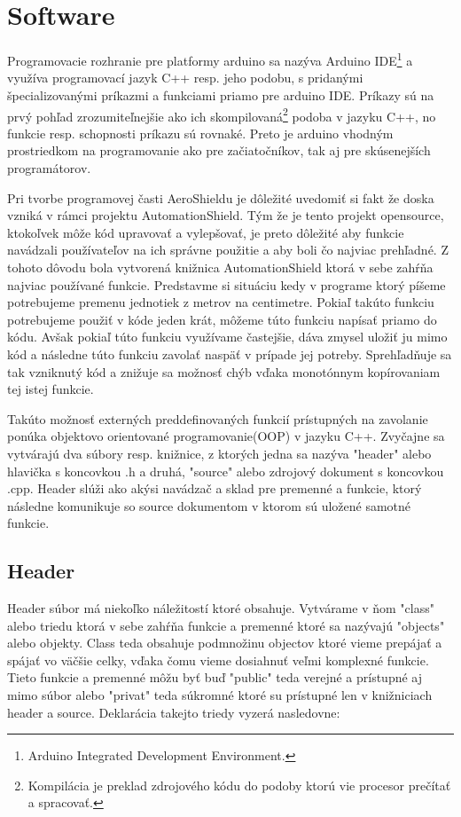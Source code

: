 \section{Software}

Programovacie rozhranie pre platformy arduino sa nazýva Arduino IDE\footnote[5]{Arduino Integrated Development Environment.} a využíva programovací jazyk C++ resp. jeho podobu, s pridanými špecializovanými príkazmi a funkciami priamo pre arduino IDE. Príkazy sú na prvý pohľad zrozumiteľnejšie ako ich skompilovaná\footnote[6]{Kompilácia je preklad zdrojového kódu do podoby ktorú vie procesor prečítať a spracovať.} podoba v jazyku C++, no funkcie resp. schopnosti príkazu sú rovnaké. Preto je arduino vhodným prostriedkom na programovanie ako pre začiatočníkov, tak aj pre skúsenejších programátorov. 

Pri tvorbe programovej časti AeroShieldu je dôležité uvedomiť si fakt že doska vzniká v rámci projektu AutomationShield. Tým že je tento projekt opensource, ktokoľvek môže kód upravovať a vylepšovať, je preto dôležité aby funkcie navádzali používateľov na ich správne použitie a aby boli čo najviac prehľadné. Z tohoto dôvodu bola vytvorená knižnica AutomationShield ktorá v sebe zahŕňa najviac používané funkcie. Predstavme si situáciu kedy v programe ktorý píšeme potrebujeme premenu jednotiek z metrov na centimetre. Pokiaľ takúto funkciu potrebujeme použiť v kóde jeden krát, môžeme túto funkciu napísať priamo do kódu. Avšak pokiaľ túto funkciu využívame častejšie, dáva zmysel uložiť ju mimo kód a následne túto funkciu zavolať naspäť v prípade jej potreby. Sprehľadňuje sa tak vzniknutý kód a znižuje sa možnosť chýb vďaka monotónnym kopírovaniam tej istej funkcie. 

Takúto možnosť externých preddefinovaných funkcií prístupných na zavolanie ponúka objektovo orientované programovanie(OOP) v jazyku C++. Zvyčajne sa vytvárajú dva súbory resp. knižnice, z ktorých jedna sa nazýva "header" alebo hlavička s koncovkou .h a druhá, "source" alebo zdrojový dokument s koncovkou .cpp. Header slúži ako akýsi navádzač a sklad pre premenné a funkcie, ktorý následne komunikuje so source dokumentom v ktorom sú uložené samotné funkcie. 

\subsection{Header}

Header súbor má niekoľko náležitostí ktoré obsahuje. Vytvárame v ňom "class" alebo triedu ktorá v sebe zahŕňa funkcie a premenné ktoré sa nazývajú "objects" alebo objekty. Class teda obsahuje podmnožinu objectov ktoré vieme prepájať a spájať vo väčšie celky, vďaka čomu vieme dosiahnuť veľmi komplexné funkcie. Tieto funkcie a premenné môžu byť buď "public" teda verejné a prístupné aj mimo súbor alebo "privat" teda súkromné ktoré su prístupné len v knižniciach header a source. Deklarácia takejto triedy vyzerá nasledovne: 


